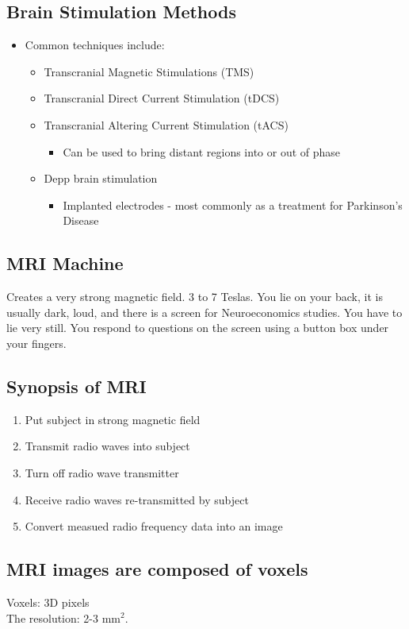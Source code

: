 \subsection{Brain Stimulation Methods}
\begin{itemize}
    \item Common techniques include:
    \begin{itemize}
        \item Transcranial Magnetic Stimulations (TMS)
        \item Transcranial Direct Current Stimulation (tDCS)
        \item Transcranial Altering Current Stimulation (tACS)
        \begin{itemize}
            \item Can be used to bring distant regions into or out of phase
        \end{itemize}
        \item Depp brain stimulation
        \begin{itemize}
            \item Implanted electrodes - most commonly as a treatment for Parkinson's Disease
        \end{itemize}
    \end{itemize}
\end{itemize}
\subsection{MRI Machine}
Creates a very strong magnetic field. 3 to 7 Teslas. You lie on your back, it is usually dark, loud, and there is a screen for Neuroeconomics studies.
You have to lie very still. You respond to questions on the screen using a button box under your fingers.
\subsection{Synopsis of MRI}
\begin{enumerate}
    \item Put subject in strong magnetic field
    \item Transmit radio waves into subject
    \item Turn off radio wave transmitter
    \item Receive radio waves re-transmitted by subject
    \item Convert measued radio frequency data into an image
\end{enumerate}
\subsection{MRI images are composed of voxels}
Voxels: 3D pixels
\\The resolution: 2-3 mm$^{2}$.
